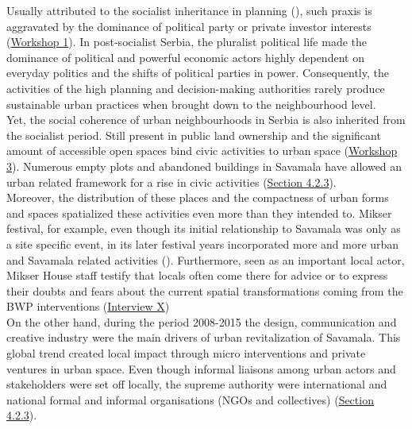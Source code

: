 \documentclass[11pt]{report}
\begin{document}
Usually attributed to the socialist inheritance in planning (\href{Vujosevis}{\citealt{vujosevic_novi_2012}}),
such praxis is aggravated by the dominance of political party or private investor interests
(\href{Expert Workshop}{Workshop 1}).
In post-socialist Serbia, the pluralist political life made the dominance of political and powerful economic actors highly dependent on everyday politics and the shifts of political parties in power. Consequently, the activities of the high planning and decision-making authorities rarely produce sustainable urban practices when brought down to the neighbourhood level.
\\

Yet, the social coherence of urban neighbourhoods in Serbia is also inherited from the socialist period. Still present in public land ownership and the significant amount of accessible open spaces bind civic activities to urban space 
(\href{Student Workshop}{Workshop 3}).
Numerous empty plots and abandoned buildings in Savamala have allowed an urban related framework for a rise in civic activities (\href{Section 4.2.3}{Section 4.2.3}).
\\

Moreover, the distribution of these places and the compactness of urban forms and spaces spatialized these activities even more than they intended to.
Mikser festival, for example, even though its initial relationship to Savamala was only as a site specific event, in its later festival years incorporated more and more urban and Savamala related activities
(\cite{(check ref  web The Game of Savamala and XXXX, Mikser Festival 2014)}).
Furthermore, seen as an important local actor, Mikser House staff testify that locals often come there for advice or to express their doubts and fears about the current spatial transformations coming from the BWP interventions 
(\href{InterviewX}{Interview X})
\\

On the other hand, during the period 2008-2015 the design, communication and creative industry were the main drivers of urban revitalization of Savamala.
This global trend created local impact through micro interventions and private ventures in urban space.
Even though informal liaisons among urban actors and stakeholders were set off locally, the supreme  authority were international and national formal and informal organisations (NGOs and collectives) (\href{Section 4.2.3}{Section 4.2.3}). %
\\
\end{document}
